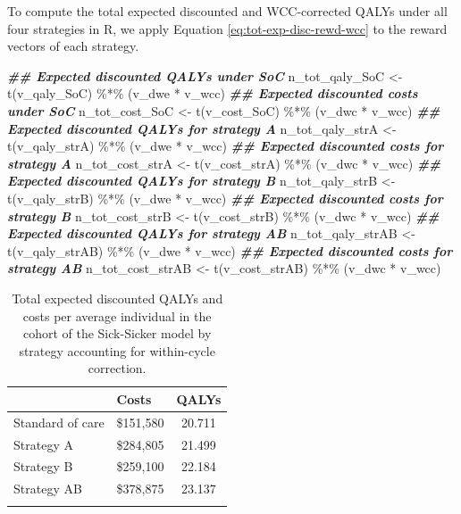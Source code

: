 \documentclass[
]{article}
\newenvironment{Shaded}{\begin{snugshade}}{\end{snugshade}}
\newcommand{\DocumentationTok}[1]{\textcolor[rgb]{0.56,0.35,0.01}{\textbf{\textit{#1}}}}
\newcommand{\FunctionTok}[1]{\textcolor[rgb]{0.00,0.00,0.00}{#1}}
\newcommand{\NormalTok}[1]{#1}
\newcommand{\OtherTok}[1]{\textcolor[rgb]{0.56,0.35,0.01}{#1}}
\newcommand{\SpecialCharTok}[1]{\textcolor[rgb]{0.00,0.00,0.00}{#1}}
\begin{document}
To compute the total expected discounted and WCC-corrected QALYs under all four strategies in R, we apply Equation \eqref{eq:tot-exp-disc-rewd-wcc} to the reward vectors of each strategy.

\begin{Shaded}
\begin{Highlighting}[]
\DocumentationTok{\#\# Expected discounted QALYs under SoC}
\NormalTok{n\_tot\_qaly\_SoC }\OtherTok{\textless{}{-}} \FunctionTok{t}\NormalTok{(v\_qaly\_SoC) }\SpecialCharTok{\%*\%}\NormalTok{ (v\_dwe }\SpecialCharTok{*}\NormalTok{ v\_wcc)}
\DocumentationTok{\#\# Expected discounted costs under SoC}
\NormalTok{n\_tot\_cost\_SoC }\OtherTok{\textless{}{-}} \FunctionTok{t}\NormalTok{(v\_cost\_SoC) }\SpecialCharTok{\%*\%}\NormalTok{ (v\_dwc }\SpecialCharTok{*}\NormalTok{ v\_wcc)}
\DocumentationTok{\#\# Expected discounted QALYs for strategy A}
\NormalTok{n\_tot\_qaly\_strA }\OtherTok{\textless{}{-}} \FunctionTok{t}\NormalTok{(v\_qaly\_strA) }\SpecialCharTok{\%*\%}\NormalTok{ (v\_dwe }\SpecialCharTok{*}\NormalTok{ v\_wcc)}
\DocumentationTok{\#\# Expected discounted costs for strategy A}
\NormalTok{n\_tot\_cost\_strA }\OtherTok{\textless{}{-}} \FunctionTok{t}\NormalTok{(v\_cost\_strA) }\SpecialCharTok{\%*\%}\NormalTok{ (v\_dwc }\SpecialCharTok{*}\NormalTok{ v\_wcc)}
\DocumentationTok{\#\# Expected discounted QALYs for strategy B}
\NormalTok{n\_tot\_qaly\_strB }\OtherTok{\textless{}{-}} \FunctionTok{t}\NormalTok{(v\_qaly\_strB) }\SpecialCharTok{\%*\%}\NormalTok{ (v\_dwe }\SpecialCharTok{*}\NormalTok{ v\_wcc)}
\DocumentationTok{\#\# Expected discounted costs for strategy B}
\NormalTok{n\_tot\_cost\_strB }\OtherTok{\textless{}{-}} \FunctionTok{t}\NormalTok{(v\_cost\_strB) }\SpecialCharTok{\%*\%}\NormalTok{ (v\_dwc }\SpecialCharTok{*}\NormalTok{ v\_wcc)}
\DocumentationTok{\#\# Expected discounted QALYs for strategy AB}
\NormalTok{n\_tot\_qaly\_strAB }\OtherTok{\textless{}{-}} \FunctionTok{t}\NormalTok{(v\_qaly\_strAB) }\SpecialCharTok{\%*\%}\NormalTok{ (v\_dwe }\SpecialCharTok{*}\NormalTok{ v\_wcc)}
\DocumentationTok{\#\# Expected discounted costs for strategy AB}
\NormalTok{n\_tot\_cost\_strAB }\OtherTok{\textless{}{-}} \FunctionTok{t}\NormalTok{(v\_cost\_strAB) }\SpecialCharTok{\%*\%}\NormalTok{ (v\_dwc }\SpecialCharTok{*}\NormalTok{ v\_wcc)}
\end{Highlighting}
\end{Shaded}

\begin{table}[!h]

\caption{\label{tab:Expected-outcomes-table}Total expected discounted QALYs and costs per average individual in the cohort of the Sick-Sicker model by strategy accounting for within-cycle correction.}
\centering
\begin{tabular}[t]{llc}
\toprule{}
  & Costs & QALYs\\
\midrule{}
Standard of care & \$151,580 & 20.711\\
Strategy A & \$284,805 & 21.499\\
Strategy B & \$259,100 & 22.184\\
Strategy AB & \$378,875 & 23.137\\
\bottomrule{}
\end{tabular}
\end{table}
\end{document}
